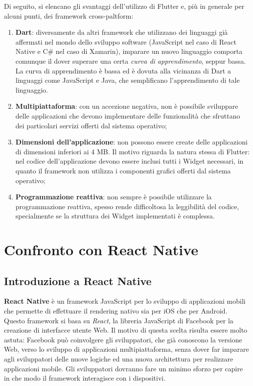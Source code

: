 Di seguito, si elencano gli svantaggi dell'utilizzo di Flutter e, più in generale per alcuni punti, dei framework cross-paltform:
\begin{enumerate}
	\item \textbf{Dart}: diversamente da altri framework che utilizzano dei linguaggi già affermati nel mondo dello sviluppo software (JavaScript nel caso di React Native e C\# nel caso di Xamarin), imparare un nuovo linguaggio comporta comunque il dover superare una certa \textit{curva di apprendimento}, seppur bassa. La curva di apprendimento è bassa ed è dovuta alla vicinanza di Dart a linguaggi come JavaScript e Java, che semplificano l'apprendimento di tale linguaggio.
	\item \textbf{Multipiattaforma}: con un accezione negativa, non è possibile sviluppare delle applicazioni che devono implementare delle funzionalità che sfruttano dei particolari servizi offerti dal sistema operativo;
	\item \textbf{Dimensioni dell'applicazione}: non possono essere create delle applicazioni di dimensioni inferiori ai 4 MB. Il motivo riguarda la natura stessa di Flutter: nel codice dell'applicazione devono essere inclusi tutti i Widget necessari, in quanto il framework non utilizza i componenti grafici offerti dal sistema operativo;
	\item \textbf{Programmazione reattiva}: non sempre è possibile utilizzare la programmazione reattiva, spesso rende difficoltosa la leggibilità del codice, specialmente se la struttura dei Widget implementati è complessa.
\end{enumerate}

\section{Confronto con React Native}

\subsection{Introduzione a React Native}
\textbf{React Native} è un framework JavaScript per lo sviluppo di applicazioni mobili che permette di effettuare il rendering nativo sia per iOS che per Android. Questo framework si basa su \textit{React}, la libreria JavaScript di Facebook per la creazione di interfacce utente Web. Il motivo di questa scelta risulta essere molto astuta: Facebook può coinvolgere gli sviluppatori, che già conoscono la versione Web, verso lo sviluppo di applicazioni multipiattaforma, senza dover far imparare  agli sviluppatori delle nuove logiche ed una nuova architettura per realizzare applicazioni mobile. Gli sviluppatori dovranno fare un minimo sforzo per capire in che modo il framework interagisce con i dispositivi.

